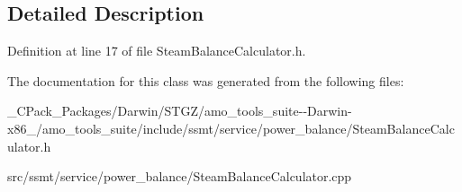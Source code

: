 \subsection{Detailed Description}


Definition at line 17 of file Steam\+Balance\+Calculator.\+h.



The documentation for this class was generated from the following files\+:\begin{DoxyCompactItemize}
\item 
\+\_\+\+C\+Pack\+\_\+\+Packages/\+Darwin/\+S\+T\+G\+Z/amo\+\_\+tools\+\_\+suite-\/-\/\+Darwin-\/x86\+\_/amo\+\_\+tools\+\_\+suite/include/ssmt/service/power\+\_\+balance/Steam\+Balance\+Calculator.\+h\item 
src/ssmt/service/power\+\_\+balance/Steam\+Balance\+Calculator.\+cpp\end{DoxyCompactItemize}
